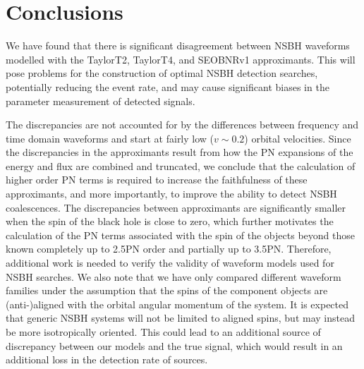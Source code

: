 \vspace{0.5cm}
\section{Conclusions}
\label{sec:conclusion}

We have found that there is significant disagreement between \ac{NSBH}
waveforms modelled with the TaylorT2, TaylorT4, and SEOBNRv1 approximants. 
This will pose problems for the construction of optimal NSBH detection searches, 
potentially reducing the event rate, 
and may cause significant biases in the parameter measurement of detected signals.

The discrepancies are not accounted for by the differences between
frequency and time domain waveforms and start at fairly low ($v \sim 0.2$) orbital velocities.
Since the discrepancies in the approximants result from how the \ac{PN} expansions of the energy and flux
are combined and truncated, we conclude
that the calculation of higher order \ac{PN} terms is required to increase the
faithfulness of these approximants, and more importantly, to improve the
ability to detect \ac{NSBH} coalescences. The
discrepancies between approximants are significantly smaller when the spin of
the black hole is close to zero, which further motivates the calculation of the
\ac{PN} terms associated with the spin of the objects beyond those known
completely up to 2.5\ac{PN} order and partially up to 3.5\ac{PN}.
Therefore, additional work is needed to verify
the validity of waveform models used for \ac{NSBH} searches.
We also note that we have
only compared different waveform families under the assumption that the spins
of the component objects are (anti-)aligned with the orbital angular momentum
of the system.  It is expected that generic \ac{NSBH} systems will not be limited to
aligned spins, but may instead be more isotropically oriented.
This could lead to an additional source of discrepancy between our models and
the true signal, which would result in an additional loss in the detection rate
of sources.

